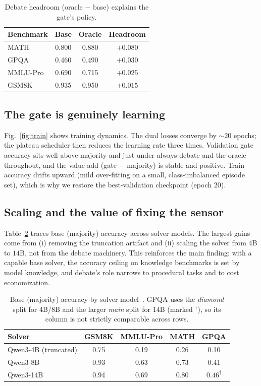 \documentclass[conference]{IEEEtran}
\begin{document}
\begin{table}[!t]
\caption{Debate headroom (oracle $-$ base) explains the gate's policy.}
\label{tab:headroom}
\centering
\begin{tabular}{lccc}
\toprule
Benchmark & Base & Oracle & Headroom \\
\midrule
MATH     & 0.800 & 0.880 & $\mathbf{+0.080}$ \\
GPQA     & 0.460 & 0.490 & $+0.030$ \\
MMLU-Pro & 0.690 & 0.715 & $+0.025$ \\
GSM8K    & 0.935 & 0.950 & $+0.015$ \\
\bottomrule
\end{tabular}
\end{table}

\subsection{The gate is genuinely learning}
Fig.~\ref{fig:train} shows training dynamics. The dual losses converge by
$\sim\!20$ epochs; the plateau scheduler then reduces the learning rate three times.
Validation gate accuracy sits well above majority and just under always-debate and the
oracle throughout, and the value-add (gate $-$ majority) is stable and positive. Train
accuracy drifts upward (mild over-fitting on a small, class-imbalanced episode set),
which is why we restore the best-validation checkpoint (epoch $20$).

\subsection{Scaling and the value of fixing the sensor}
Table~\ref{tab:scaling} traces base (majority) accuracy across solver models. The
largest gains come from (i) removing the truncation artifact and (ii) scaling the
solver from $4$B to $14$B, not from the debate machinery. This reinforces the main
finding: with a capable base solver, the accuracy ceiling on knowledge benchmarks is
set by model knowledge, and debate's role narrows to procedural tasks and to cost
economization.

\begin{table}[!t]
\caption{Base (majority) accuracy by solver model~\cite{qwen2025qwen3}. GPQA uses the
\emph{diamond} split for 4B/8B and the larger \emph{main} split for 14B (marked
$^{\dagger}$), so its column is not strictly comparable across rows.}
\label{tab:scaling}
\centering
\begin{tabular}{lcccc}
\toprule
Solver & GSM8K & MMLU-Pro & MATH & GPQA \\
\midrule
Qwen3-4B (truncated)  & 0.75 & 0.19 & 0.26 & 0.10 \\
Qwen3-8B              & 0.93 & 0.63 & 0.73 & 0.41 \\
Qwen3-14B             & 0.94 & 0.69 & 0.80 & $0.46^{\dagger}$ \\
\bottomrule
\end{tabular}
\end{table}
\end{document}
